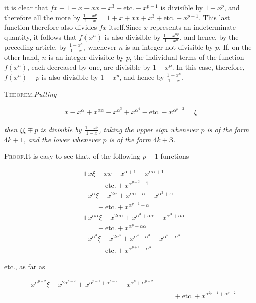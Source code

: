 it is clear that $fx-1- x-xx-x^3-\text{etc.}-x^{p-1}$ is divisible by $1-x^p$, and therefore all the more by $\frac{1-x^p}{1-x}=1+x+xx+x^3+\text{etc.}+x^{p-1}$. This last function therefore also divides $fx$ itself.\quad Since $x$ represents an indeterminate quantity, it follows that $f(x^n)$ is also divisible by $\frac{1-x^{np}}{1-x^n}$, and hence, by the preceding article, by $\frac{1-x^p}{1-x}$, whenever $n$ is an integer not divisible by $p$. If, on the other hand, $n$ is an integer divisible by $p$, the individual terms of the function $f(x^n)$, each decreased by one, are divisible by $1-x^p$. In this case, therefore, $f(x^n)-p$ is also divisible by $1-x^p$, and hence by $\frac{1-x^p}{1-x}$.


\textsc{Theorem.}\quad \textit{Putting}

\[
\begin{aligned}
x-x^\alpha+x^{\alpha\alpha}-x^{\alpha^3}+x^{\alpha^4}-\text{etc.}-x^{\alpha^{p-2}}=\xi
\end{aligned}
\]

\textit{then $\xi\xi\mp p$ is divisible by $\frac{1-x^p}{1-x}$, taking the upper sign whenever $p$ is of the form $4k+1$, and the lower whenever $p$ is of the form $4k+3$.}

\textsc{Proof.}\quad It is easy to see that, of the following $p-1$ functions

\[
\begin{aligned}
&+x\xi-xx+x^{\alpha+1}-x^{\alpha\alpha+1}\\&\qquad+\text{etc.}+x^{\alpha^{p-2}+1}\\
&-x^\alpha\xi-x^{2\alpha}+x^{\alpha\alpha+\alpha}-x^{\alpha^3+\alpha}\\&\qquad+\text{etc.}+x^{\alpha^{p-1}+\alpha}\\
&+x^{\alpha\alpha}\xi-x^{2\alpha\alpha}+x^{\alpha^3+\alpha\alpha}-x^{\alpha^4+\alpha\alpha}\\&\qquad+\text{etc.}+x^{\alpha^p+\alpha\alpha}\\
&-x^{\alpha^3}\xi-x^{2\alpha^3}+x^{\alpha^4+\alpha^3}-x^{\alpha^5+\alpha^3}\\&\qquad+\text{etc.}+x^{\alpha^{p+1}+\alpha^3}
\end{aligned}
\]

etc., as far as

\[
\begin{aligned}
-x^{\alpha^{p-2}}\xi-x^{2\alpha^{p-2}}+x^{\alpha^{p-1}+\alpha^{p-2}}-x^{\alpha^p+\alpha^{p-2}}\\&\qquad+\text{etc.}+x^{\alpha^{2p-4}+\alpha^{p-2}}
\end{aligned}
\]

